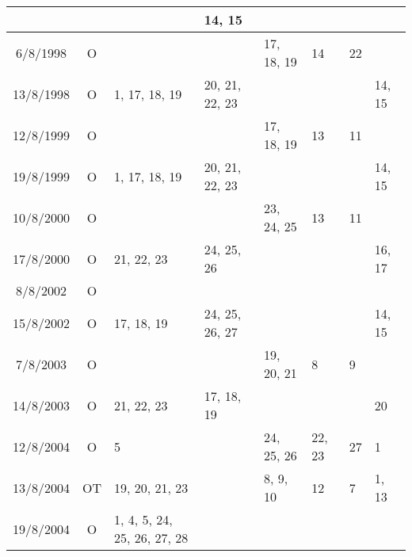 \begin{longtable}{|c|c|p{1.85cm}|p{1.85cm}|p{1.85cm}|p{1.85cm}|p{1.85cm}|p{1.85cm}|}
	\raggedright & 
	\raggedright & 
	\raggedright & 
	\raggedright 14, 15
	\tabularnewline
\hline
	6/8/1998	&
	O &
	\raggedright & 
	\raggedright & 
	\raggedright 17, 18, 19 & 
	\raggedright 14 & 
	\raggedright 22 &
	\raggedright 
	\tabularnewline
\hline
	13/8/1998	 &
	O &
	\raggedright 1, 17, 18, 19 & 
	\raggedright 20, 21, 22, 23 & 
	\raggedright & 
	\raggedright & 
	\raggedright & 
	\raggedright 14, 15
	\tabularnewline
\hline
	12/8/1999	 &
	O &
	\raggedright & 
	\raggedright & 
	\raggedright 17, 18, 19 & 
	\raggedright 13 & 
	\raggedright 11 &
	\raggedright 
	\tabularnewline
\hline
	19/8/1999	 &
	O &
	\raggedright 1, 17, 18, 19 & 
	\raggedright 20, 21, 22, 23 & 
	\raggedright & 
	\raggedright & 
	\raggedright & 
	\raggedright 14, 15
	\tabularnewline
\hline
	10/8/2000	 &
	O &
	\raggedright & 
	\raggedright & 
	\raggedright 23, 24, 25 & 
	\raggedright 13 & 
	\raggedright 11 &
	\raggedright 
	\tabularnewline
\hline
	17/8/2000	 &
	O &
	\raggedright 21, 22, 23 & 
	\raggedright 24, 25, 26 & 
	\raggedright & 
	\raggedright & 
	\raggedright & 
	\raggedright 16, 17
	\tabularnewline
\hline
	8/8/2002	&
	O &
	\raggedright & 
	\raggedright & 
	\raggedright & 
	\raggedright & 
	\raggedright &
	\raggedright 
	\tabularnewline
\hline
	15/8/2002	 &
	O &
	\raggedright 17, 18, 19 & 
	\raggedright 24, 25, 26, 27 & 
	\raggedright & 
	\raggedright & 
	\raggedright & 
	\raggedright 14, 15
	\tabularnewline
\hline
	7/8/2003	&
	O &
	\raggedright & 
	\raggedright & 
	\raggedright 19, 20, 21 & 
	\raggedright 8 & 
	\raggedright 9 &
	\raggedright 
	\tabularnewline
\hline
	14/8/2003	 &
	O &
	\raggedright 21, 22, 23 & 
	\raggedright 17, 18, 19 & 
	\raggedright & 
	\raggedright & 
	\raggedright & 
	\raggedright 20
	\tabularnewline
\hline
	12/8/2004	&
	O &
	\raggedright 5 &
	\raggedright  & 
	\raggedright 24, 25, 26 &
	\raggedright 22, 23 &
	\raggedright 27 &
	\raggedright 1
	\tabularnewline
\hline
	13/8/2004	&
	OT	&
	\raggedright 19, 20, 21, 23 &
	\raggedright  &
	\raggedright 8, 9, 10 &
	\raggedright 12 &
	\raggedright 7 &
	\raggedright 1, 13
	\tabularnewline
\hline
	19/8/2004	&
	O	&
	\raggedright 1, 4, 5, 24, 25, 26, 27, 28 &

\end{longtable}
